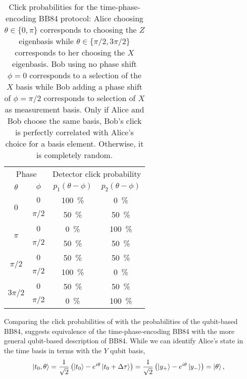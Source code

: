 \begin{table}[htb]
	\centering
	\begin{tabular}{cccc}
		\toprule
		\multicolumn{2}{c}{Phase} & \multicolumn{2}{c}{Detector click probability} \\
		\cmidrule{1-2}
		\cmidrule{3-4}
		$\theta$ & $\phi$ & $p_1(\theta-\phi)$ & $p_2(\theta-\phi)$ \\
		\midrule
		\multirow{2}{*}{$0$} & $0$ & \SI{100}{\percent} & \SI{0}{\percent} \\
		& $\pi/2$ & \SI{50}{\percent} & \SI{50}{\percent} \\
		\cmidrule{1-2}
		\multirow{2}{*}{$\pi$} & $0$ & \SI{0}{\percent} & \SI{100}{\percent} \\
		& $\pi/2$ & \SI{50}{\percent} & \SI{50}{\percent} \\
		\cmidrule{1-2}
		\multirow{2}{*}{$\pi/2$} & $0$ & \SI{50}{\percent} & \SI{50}{\percent} \\
		& $\pi/2$ & \SI{100}{\percent} & \SI{0}{\percent} \\
		\cmidrule{1-2}
		\multirow{2}{*}{$3\pi/2$} & $0$ & \SI{50}{\percent} & \SI{50}{\percent} \\
		& $\pi/2$ & \SI{0}{\percent} & \SI{100}{\percent} \\
		\bottomrule
	\end{tabular}
	\caption{Click probabilities for the time-phase-encoding BB84 protocol: Alice choosing $\theta\in\{0,\pi\}$ corresponds to choosing the $Z$ eigenbasis while $\theta\in\{\pi/2,3\pi/2\}$ corresponds to her choosing the $X$ eigenbasis. Bob using no phase shift $\phi=0$ corresponds to a selection of the $X$ basis while Bob adding a phase shift of $\phi=\pi/2$ corresponds to selection of $X$ as measurement basis. Only if Alice and Bob choose the same basis, Bob's click is perfectly correlated with Alice's choice for a basis element. Otherwise, it is completely random.}\label{tab:bb84_time_phase_clicks}
\end{table}
Comparing the click probabilities of  with the probabilities of the qubit-based BB84, suggests equivalence of the time-phase-encoding BB84 with the more general qubit-based description of BB84.
While we can identify Alice's state in the time basis in terms with the $Y$ qubit basis,
\begin{equation}
	\ket{t_0,\theta}
	=
	\frac{1}{\sqrt{2}}
	\left(
		\ket{t_0}
		-
		e^{i\theta}
		\ket{t_0+\Delta\tau}
	\right)
	=
	\frac{1}{\sqrt{2}}
	\left(
		\ket{y_+}
		-
		e^{i\theta}
		\ket{y_-}
	\right)
	=
	\ket{\theta}
	,
\end{equation}

